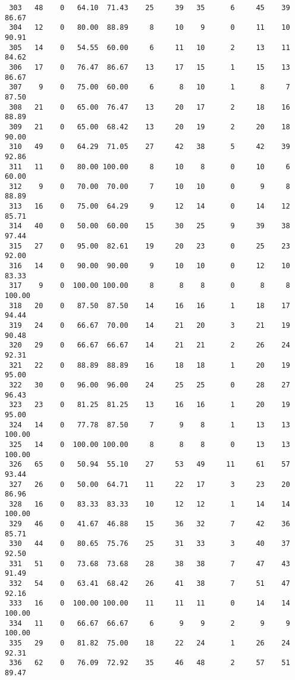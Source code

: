 \begin{verbatim}
 303   48    0   64.10  71.43    25     39   35      6     45    39    86.67
 304   12    0   80.00  88.89     8     10    9      0     11    10    90.91
 305   14    0   54.55  60.00     6     11   10      2     13    11    84.62
 306   17    0   76.47  86.67    13     17   15      1     15    13    86.67
 307    9    0   75.00  60.00     6      8   10      1      8     7    87.50
 308   21    0   65.00  76.47    13     20   17      2     18    16    88.89
 309   21    0   65.00  68.42    13     20   19      2     20    18    90.00
 310   49    0   64.29  71.05    27     42   38      5     42    39    92.86
 311   11    0   80.00 100.00     8     10    8      0     10     6    60.00
 312    9    0   70.00  70.00     7     10   10      0      9     8    88.89
 313   16    0   75.00  64.29     9     12   14      0     14    12    85.71
 314   40    0   50.00  60.00    15     30   25      9     39    38    97.44
 315   27    0   95.00  82.61    19     20   23      0     25    23    92.00
 316   14    0   90.00  90.00     9     10   10      0     12    10    83.33
 317    9    0  100.00 100.00     8      8    8      0      8     8   100.00
 318   20    0   87.50  87.50    14     16   16      1     18    17    94.44
 319   24    0   66.67  70.00    14     21   20      3     21    19    90.48
 320   29    0   66.67  66.67    14     21   21      2     26    24    92.31
 321   22    0   88.89  88.89    16     18   18      1     20    19    95.00
 322   30    0   96.00  96.00    24     25   25      0     28    27    96.43
 323   23    0   81.25  81.25    13     16   16      1     20    19    95.00
 324   14    0   77.78  87.50     7      9    8      1     13    13   100.00
 325   14    0  100.00 100.00     8      8    8      0     13    13   100.00
 326   65    0   50.94  55.10    27     53   49     11     61    57    93.44
 327   26    0   50.00  64.71    11     22   17      3     23    20    86.96
 328   16    0   83.33  83.33    10     12   12      1     14    14   100.00
 329   46    0   41.67  46.88    15     36   32      7     42    36    85.71
 330   44    0   80.65  75.76    25     31   33      3     40    37    92.50
 331   51    0   73.68  73.68    28     38   38      7     47    43    91.49
 332   54    0   63.41  68.42    26     41   38      7     51    47    92.16
 333   16    0  100.00 100.00    11     11   11      0     14    14   100.00
 334   11    0   66.67  66.67     6      9    9      2      9     9   100.00
 335   29    0   81.82  75.00    18     22   24      1     26    24    92.31
 336   62    0   76.09  72.92    35     46   48      2     57    51    89.47

\end{verbatim}

